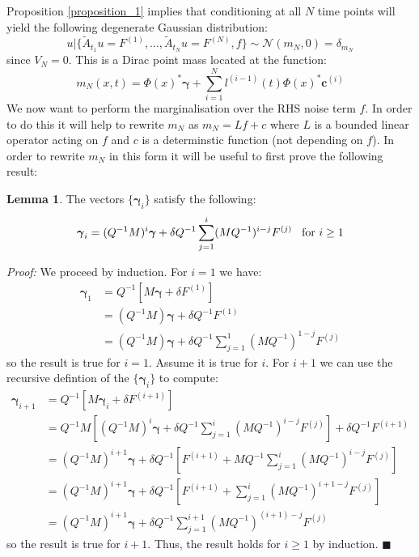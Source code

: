 \documentclass{article}
\renewcommand\qedsymbol{$\blacksquare$}
\theoremstyle{definition}
\newtheorem{lemma}[theorem]{Lemma}
\theoremstyle{remark}
\theoremstyle{remark}
\begin{document}
\noindent Proposition \ref{proposition_1} implies that conditioning at all $N$ time points will yield the following degenerate Gaussian distribution:
\begin{equation}
    u|\{\tilde{A}_{t_1}u=F^{(1)},\dots,\tilde{A}_{t_N}u=F^{(N)},f\}\sim\mathcal{N}(m_{N},0)=\delta_{m_N}
\end{equation}
since $V_N=0$. This is a Dirac point mass located at the function:
\begin{equation}
    m_{N}(x,t)=\Phi(x)^{*}\boldsymbol{\gamma}+\sum_{i=1}^{N}l^{(i-1)}(t)\Phi(x)^{*}\boldsymbol{c}^{(i)}
\end{equation}
We now want to perform the marginalisation over the RHS noise term $f$. In order to do this it will help to rewrite $m_N$ as $m_N=Lf+c$ where $L$ is a bounded linear operator acting on $f$ and $c$ is a determinstic function (not depending on $f$). In order to rewrite $m_N$ in this form it will be useful to first prove the following result:
\begin{lemma}
    \label{lemma_1}
    The vectors $\{\boldsymbol{\gamma}_{i}\}$ satisfy the following:
    \begin{equation}
        \label{f-dependenceOfgammas}
        \boldsymbol{\gamma}_{i}=(Q^{-1}M)^{i}\boldsymbol{\gamma}+\delta Q^{-1}\sum_{j=1}^{i}(MQ^{-1})^{i-j}F^{(j)} \hspace{0.3cm}\text{for } i\geq 1
    \end{equation}
\end{lemma}
\noindent \textit{Proof:} We proceed by induction. For $i=1$ we have:
\begin{align*}
    \boldsymbol{\gamma}_{1} &= Q^{-1}\left[M\boldsymbol{\gamma}+\delta F^{(1)}\right] \\
    &= (Q^{-1}M)\boldsymbol{\gamma} + \delta Q^{-1}F^{(1)} \\
    &= (Q^{-1}M)\boldsymbol{\gamma} + \delta Q^{-1}\sum_{j=1}^{1}(MQ^{-1})^{1-j}F^{(j)}
\end{align*}
so the result is true for $i=1$. Assume it is true for $i$. For $i+1$ we can use the recursive defintion of the $\{\boldsymbol{\gamma}_i\}$ to compute:
\begin{align*}
    \boldsymbol{\gamma}_{i+1} &= Q^{-1}\left[M\boldsymbol{\gamma}_{i}+\delta F^{(i+1)}\right] \\
    &= Q^{-1}M\left[(Q^{-1}M)^{i}\boldsymbol{\gamma}+\delta Q^{-1}\sum_{j=1}^{i}(MQ^{-1})^{i-j}F^{(j)}\right] + \delta Q^{-1}F^{(i+1)} \\
    &= (Q^{-1}M)^{i+1}\boldsymbol{\gamma}+\delta Q^{-1}\left[F^{(i+1)}+MQ^{-1}\sum_{j=1}^{i}(MQ^{-1})^{i-j}F^{(j)}\right] \\
    &= (Q^{-1}M)^{i+1}\boldsymbol{\gamma} + \delta Q^{-1}\left[F^{(i+1)}+\sum_{j=1}^{i}(MQ^{-1})^{i+1-j}F^{(j)}\right] \\
    &= (Q^{-1}M)^{i+1}\boldsymbol{\gamma} + \delta Q^{-1}\sum_{j=1}^{i+1}(MQ^{-1})^{(i+1)-j}F^{(j)}
\end{align*}
so the result is true for $i+1$. Thus, the result holds for $i\geq 1$ by induction. \qedsymbol
\end{document}
